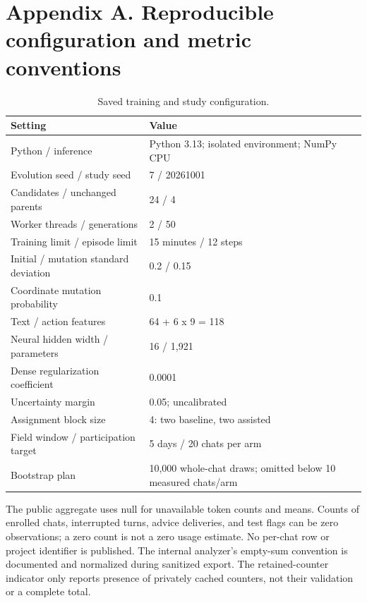 \documentclass[11pt]{article}
\begin{document}
\section*{Appendix A. Reproducible configuration and metric conventions}
\setcounter{table}{0}
\renewcommand{\thetable}{A\arabic{table}}
\begin{table}[htbp]
\centering
\small
\caption{Saved training and study configuration.}
\begin{tabularx}{\linewidth}{@{}XX@{}}
\toprule
Setting & Value\\
\midrule
Python / inference & Python 3.13; isolated environment; NumPy CPU\\
Evolution seed / study seed & 7 / 20261001\\
Candidates / unchanged parents & 24 / 4\\
Worker threads / generations & 2 / 50\\
Training limit / episode limit & 15 minutes / 12 steps\\
Initial / mutation standard deviation & 0.2 / 0.15\\
Coordinate mutation probability & 0.1\\
Text / action features & 64 + 6 x 9 = 118\\
Neural hidden width / parameters & 16 / 1,921\\
Dense regularization coefficient & 0.0001\\
Uncertainty margin & 0.05; uncalibrated\\
Assignment block size & 4: two baseline, two assisted\\
Field window / participation target & 5 days / 20 chats per arm\\
Bootstrap plan & 10,000 whole-chat draws; omitted below 10 measured chats/arm\\
\bottomrule
\end{tabularx}
\end{table}
The public aggregate uses null for unavailable token counts and means. Counts of enrolled chats, interrupted turns, advice deliveries, and test flags can be zero observations; a zero count is not a zero usage estimate. No per-chat row or project identifier is published. The internal analyzer's empty-sum convention is documented and normalized during sanitized export. The retained-counter indicator only reports presence of privately cached counters, not their validation or a complete total.
\end{document}
